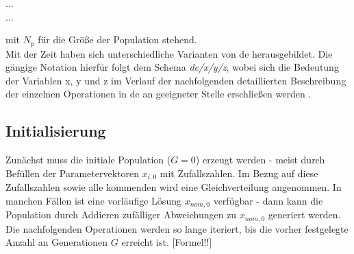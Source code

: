 		\begin{algorithm*}[H]
			\SetAlgoLined
			...\\
			...
		\end{algorithm*}
	
		mit $N_{p}$ für die Größe der Population stehend.\\
		Mit der Zeit haben sich unterschiedliche Varianten von \gls{de} herausgebildet. Die gängige Notation hierfür folgt dem Schema \textit{\gls{de}/x/y/z}, wobei sich die Bedeutung der Variablen x, y und z im Verlauf der nachfolgenden detaillierten Beschreibung der einzelnen Operationen in \gls{de} an geeigneter Stelle erschließen werden \cite{storn-price-de, storn-price-de-book}. 
		
		\subsection{Initialisierung}
		\label{sec:de-init}
		
			Zunächst muss die initiale Population ($G = 0$) erzeugt werden - 
			meist durch Befüllen der Parametervektoren $x_{i, 0}$ mit 
			Zufallszahlen. Im Bezug auf diese Zufallszahlen sowie alle 
			kommenden wird eine Gleichverteilung angenommen. In manchen Fällen 
			ist eine vorläufige Lösung $x_{nom, 0}$ verfügbar - dann kann die 
			Population durch Addieren zufälliger Abweichungen zu $x_{nom, 0}$ 
			generiert werden. Die nachfolgenden Operationen werden so lange 
			iteriert, bis die vorher festgelegte Anzahl an Generationen $G$ 
			erreicht ist. \color{red} [Formel!!] \color{black}
			
